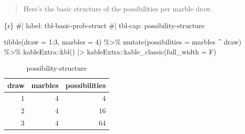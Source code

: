 \documentclass[
  letterpaper,
  DIV=11,
  numbers=noendperiod]{scrreprt}
\newenvironment{Shaded}{\begin{snugshade}}{\end{snugshade}}
\newcommand{\AttributeTok}[1]{\textcolor[rgb]{0.40,0.45,0.13}{#1}}
\newcommand{\CommentTok}[1]{\textcolor[rgb]{0.37,0.37,0.37}{#1}}
\newcommand{\DecValTok}[1]{\textcolor[rgb]{0.68,0.00,0.00}{#1}}
\newcommand{\FunctionTok}[1]{\textcolor[rgb]{0.28,0.35,0.67}{#1}}
\newcommand{\InformationTok}[1]{\textcolor[rgb]{0.37,0.37,0.37}{#1}}
\newcommand{\NormalTok}[1]{\textcolor[rgb]{0.00,0.23,0.31}{#1}}
\newcommand{\SpecialCharTok}[1]{\textcolor[rgb]{0.37,0.37,0.37}{#1}}
\begin{document}
\begin{quote}
Here's the basic structure of the possibilities per marble draw.
\end{quote}

\begin{Shaded}
\begin{Highlighting}[]
\InformationTok{\textasciigrave{}\textasciigrave{}\textasciigrave{}\{r\}}
\CommentTok{\#| label: tbl{-}basic{-}prob{-}struct}
\CommentTok{\#| tbl{-}cap: possibility{-}structure}

\FunctionTok{tibble}\NormalTok{(}\AttributeTok{draw    =} \DecValTok{1}\SpecialCharTok{:}\DecValTok{3}\NormalTok{,}
       \AttributeTok{marbles =} \DecValTok{4}\NormalTok{) }\SpecialCharTok{\%\textgreater{}\%} 
  \FunctionTok{mutate}\NormalTok{(}\AttributeTok{possibilities =}\NormalTok{ marbles }\SpecialCharTok{\^{}}\NormalTok{ draw) }\SpecialCharTok{\%\textgreater{}\%} 
\NormalTok{  kableExtra}\SpecialCharTok{::}\FunctionTok{kbl}\NormalTok{() }\SpecialCharTok{|\textgreater{}} 
\NormalTok{  kableExtra}\SpecialCharTok{::}\FunctionTok{kable\_classic}\NormalTok{(}\AttributeTok{full\_width =}\NormalTok{ F)}
\InformationTok{\textasciigrave{}\textasciigrave{}\textasciigrave{}}
\end{Highlighting}
\end{Shaded}

\hypertarget{tbl-basic-prob-struct}{}
\begin{table}
\caption{\label{tbl-basic-prob-struct}possibility-structure }\tabularnewline

\centering
\begin{tabular}[t]{r|r|r}
\hline
draw & marbles & possibilities\\
\hline
1 & 4 & 4\\
\hline
2 & 4 & 16\\
\hline
3 & 4 & 64\\
\hline
\end{tabular}
\end{table}
\end{document}
